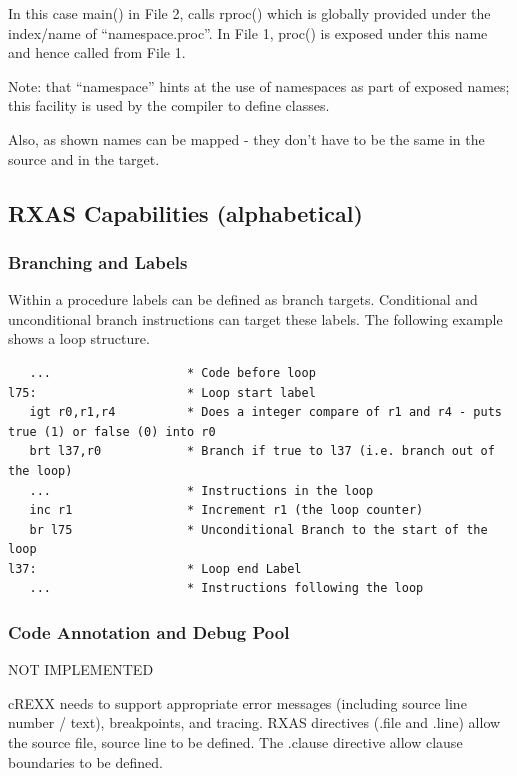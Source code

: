 In this case main() in File 2, calls rproc() which is globally provided
under the index/name of ``namespace.proc''. In File 1, proc() is exposed
under this name and hence called from File 1.

Note: that ``namespace'' hints at the use of namespaces as part of
exposed names; this facility is used by the compiler to define classes.

Also, as shown names can be mapped - they don't have to be the same in
the source and in the target.

\hypertarget{rxas-capabilities-alphabetical}{%
\subsection{RXAS Capabilities
(alphabetical)}\label{rxas-capabilities-alphabetical}}

\hypertarget{branching-and-labels}{%
\subsubsection{Branching and Labels}\label{branching-and-labels}}

Within a procedure labels can be defined as branch targets. Conditional
and unconditional branch instructions can target these labels. The
following example shows a loop structure.

\begin{verbatim}
   ...                   * Code before loop
l75:                     * Loop start label
   igt r0,r1,r4          * Does a integer compare of r1 and r4 - puts true (1) or false (0) into r0
   brt l37,r0            * Branch if true to l37 (i.e. branch out of the loop)
   ...                   * Instructions in the loop
   inc r1                * Increment r1 (the loop counter)
   br l75                * Unconditional Branch to the start of the loop
l37:                     * Loop end Label 
   ...                   * Instructions following the loop
\end{verbatim}

\hypertarget{code-annotation-and-debug-pool}{%
\subsubsection{Code Annotation and Debug
Pool}\label{code-annotation-and-debug-pool}}

NOT IMPLEMENTED

cREXX needs to support appropriate error messages (including source line
number / text), breakpoints, and tracing. RXAS directives (.file and
.line) allow the source file, source line to be defined. The .clause
directive allow clause boundaries to be defined.


